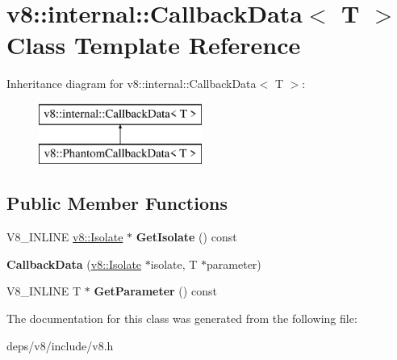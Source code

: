 \hypertarget{classv8_1_1internal_1_1_callback_data}{}\section{v8\+:\+:internal\+:\+:Callback\+Data$<$ T $>$ Class Template Reference}
\label{classv8_1_1internal_1_1_callback_data}
Inheritance diagram for v8\+:\+:internal\+:\+:Callback\+Data$<$ T $>$\+:\begin{figure}[H]
\begin{center}
\leavevmode
\includegraphics[height=2.000000cm]{classv8_1_1internal_1_1_callback_data}
\end{center}
\end{figure}
\subsection*{Public Member Functions}
\begin{DoxyCompactItemize}
\item 
\hypertarget{classv8_1_1internal_1_1_callback_data_ab6c016ece9a63f4476f20ad1f49d310d}{}V8\+\_\+\+I\+N\+L\+I\+N\+E \hyperlink{classv8_1_1_isolate}{v8\+::\+Isolate} $\ast$ {\bfseries Get\+Isolate} () const \label{classv8_1_1internal_1_1_callback_data_ab6c016ece9a63f4476f20ad1f49d310d}

\item 
\hypertarget{classv8_1_1internal_1_1_callback_data_a76988893c2c2d2aa1f4037966cd838d3}{}{\bfseries Callback\+Data} (\hyperlink{classv8_1_1_isolate}{v8\+::\+Isolate} $\ast$isolate, T $\ast$parameter)\label{classv8_1_1internal_1_1_callback_data_a76988893c2c2d2aa1f4037966cd838d3}

\item 
\hypertarget{classv8_1_1internal_1_1_callback_data_aa552c3b4f0d269067cff0e004a0ddbd2}{}V8\+\_\+\+I\+N\+L\+I\+N\+E T $\ast$ {\bfseries Get\+Parameter} () const \label{classv8_1_1internal_1_1_callback_data_aa552c3b4f0d269067cff0e004a0ddbd2}

\end{DoxyCompactItemize}


The documentation for this class was generated from the following file\+:\begin{DoxyCompactItemize}
\item 
deps/v8/include/v8.\+h\end{DoxyCompactItemize}
